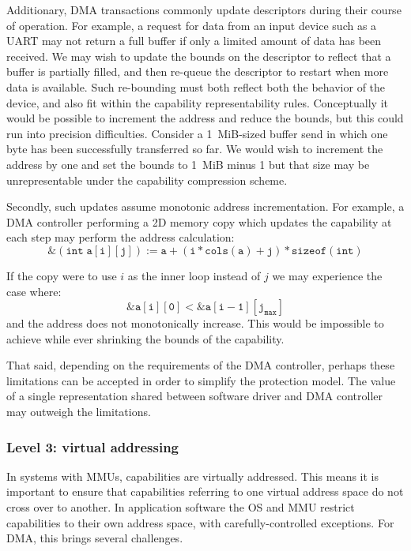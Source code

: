 Additionary, DMA transactions commonly update descriptors during their course of operation.
For example, a request for data from an input device such as a UART may not return a full buffer if only a limited amount of data has been received.
We may wish to update the bounds on the descriptor to reflect that a buffer is partially filled, and then re-queue the descriptor to restart when more data is available.
Such re-bounding must both reflect both the behavior of the device, and also fit within the capability representability rules.
Conceptually it would be possible to increment the address and reduce the bounds, but this could run into precision difficulties.
Consider a 1~MiB-sized buffer send in which one byte has been successfully transferred so far.
We would wish to increment the address by one and set the bounds to 1~MiB minus 1 but that size may be unrepresentable under the capability compression scheme.

Secondly, such updates assume monotonic address incrementation.
For example, a DMA controller performing a 2D memory copy which updates the capability at each step may perform the address calculation:
\begin{equation}
\mathtt{\&(int\;a[i][j]) := a + (i*cols(a) + j)*sizeof(int)}
\end{equation}

If the copy were to use $i$ as the inner loop instead of $j$ we may experience the case where:
\begin{equation}
\mathtt{\&a[i][0] < \&a[i-1][j_{max}]}
\end{equation}
and the address does not monotonically increase.
This would be impossible to achieve while ever shrinking the bounds of the capability.

That said, depending on the requirements of the DMA controller, perhaps these limitations can be accepted in order to simplify the protection model.
The value of a single representation shared between software driver and DMA controller may outweigh the limitations.

\subsubsection{Level 3: virtual addressing}
In systems with MMUs, capabilities are virtually addressed.
This means it is important to ensure that capabilities referring to one virtual address space do not cross over to another.
In application software the OS and MMU restrict capabilities to their own address space, with carefully-controlled exceptions.
For DMA, this brings several challenges.

